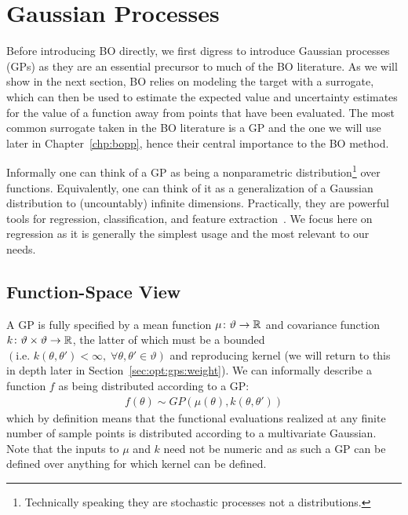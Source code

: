 
\section{Gaussian Processes}
\label{sec:opt:GPs}

Before introducing BO directly, we first digress to introduce Gaussian
processes (GPs) as they are an essential precursor to much of the BO literature.  
As we will show in the next section, BO relies on modeling the target with a surrogate,
which can then be used to estimate the expected value and uncertainty estimates for 
the value of a function away from points that have been evaluated.  The most common
surrogate taken in the BO literature is a GP and the one we will use later in Chapter~\ref{chp:bopp}, 
hence their central importance to the BO method.

Informally one can think of a GP \citep{rasmussen2006gaussian} as being a nonparametric 
distribution\footnote{Technically speaking they are stochastic processes not a distributions.} over functions.
Equivalently, one can think of it as a generalization of a Gaussian distribution
to (uncountably) infinite dimensions.  Practically, they are powerful tools for regression, classification,
and feature extraction~\citep{kuss2005assessing,lawrence2004gaussian}.  We focus here on regression as it is generally
the simplest usage and the most relevant to our needs.

\subsection{Function-Space View}
\label{sec:opt:GPs:function}

A GP is fully specified by a mean function $\mu \colon \vartheta \rightarrow \mathbb{R}$ and covariance function 
$k \colon \vartheta \times \vartheta \rightarrow \mathbb{R}$, the latter of which must be a bounded 
$\left(\text{i.e. }k\left(\theta,\theta'\right)<\infty, \; \forall \theta,\theta' \in \vartheta\right)$ 
and reproducing kernel (we will return to this in depth later in Section~\ref{sec:opt:gps:weight}).  
We can informally describe a function $f$ as being distributed 
according to a GP:
\begin{align}
\label{eq:GP}
f \left(\theta\right) \sim GP \left(\mu\left(\theta\right), k\left(\theta,\theta'\right)\right)
\end{align}
which by definition means that the functional evaluations realized at any finite number of sample points is distributed according to a multivariate Gaussian. Note that the inputs to $\mu$ and $k$ need not be numeric and as such a GP can be defined over anything for which kernel can be defined.

